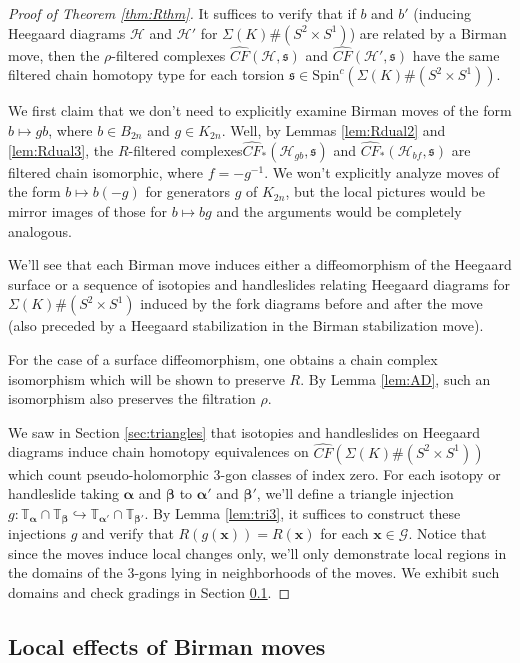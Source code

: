 \documentclass[11pt]{article}
\theoremstyle{plain} \newtheorem{thm}{Theorem}[subsection]
\theoremstyle{plain} \newtheorem{cor}[thm]{Corollary}
\theoremstyle{plain} \newtheorem{prop}[thm]{Proposition}
\theoremstyle{plain} \newtheorem{conj}[thm]{Conjecture}
\theoremstyle{plain} \newtheorem{lem}[thm]{Lemma}
\theoremstyle{definition} \newtheorem{df}[thm]{Definition}
\theoremstyle{remark} \newtheorem{rmk}[thm]{Remark}
\theoremstyle{remark} \newtheorem{obs}[thm]{Observation}
\newcommand{\B}[1]{B_{#1} }
\newcommand{\K}[1]{K_{#1} }
\newcommand{\DBCs}[1]{\Sigma(#1)\#(S^{2}\times S^{1})}
\newcommand{\G}{\mathcal{G}}
\newcommand{\h}{\mathcal{H}}
\newcommand{\Scx}[1]{\text{Spin}^{c}(\DBCs{#1})}
\newcommand{\ba}{\boldsymbol{\alpha}}
\newcommand{\bb}{\boldsymbol{\beta}}
\newcommand{\bx}{\mathbf{x}}
\newcommand{\tor}[1]{\mathbb{T}_{#1}}
\begin{document}
\begin{proof}[Proof of Theorem \ref{thm:Rthm}]
It suffices to verify that if $b$ and $b'$ (inducing Heegaard diagrams $\h$ and $\h'$ for $\DBCs{K}$) are related by a Birman move, then the $\rho$-filtered complexes $\widehat{CF}(\h, \mathfrak{s})$ and $\widehat{CF}(\h', \mathfrak{s})$ have the same filtered chain homotopy type for each torsion $\mathfrak{s} \in \Scx{K}$.

We first claim that we don't need to explicitly examine Birman moves of the form $b \mapsto gb$, where $b \in \B{2n}$ and $g \in \K{2n}$.  Well, by Lemmas \ref{lem:Rdual2} and \ref{lem:Rdual3}, the $R$-filtered complexes$\widehat{CF}_{*}(\h_{gb}, \mathfrak{s})$ and $\widehat{CF}_{*}(\h_{bf}, \mathfrak{s})$ are filtered chain isomorphic, where $f = -g^{-1}$.  We won't explicitly analyze moves of the form $b \mapsto b(-g)$ for generators $g$ of $\K{2n}$, but the local pictures would be mirror images of those for $b \mapsto bg$ and the arguments would be completely analogous.

We'll see that each Birman move induces either a diffeomorphism of the Heegaard surface or a sequence of isotopies and handleslides relating Heegaard diagrams for $\DBCs{K}$ induced by the fork diagrams before and after the move (also preceded by a Heegaard stabilization in the Birman stabilization move).

For the case of a surface diffeomorphism, one obtains a chain complex isomorphism which will be shown to  preserve $R$.  By Lemma \ref{lem:AD}, such an isomorphism also preserves the filtration $\rho$.

We saw in Section \ref{sec:triangles} that isotopies and handleslides on Heegaard diagrams induce chain homotopy equivalences on $\widehat{CF}(\DBCs{K})$ which count pseudo-holomorphic 3-gon classes of index zero.  For each isotopy or handleslide taking $\ba$ and $\bb$ to $\ba'$ and $\bb'$, we'll define a triangle injection $g:\tor{\ba} \cap \tor{\bb} \hookrightarrow \tor{\ba'} \cap \tor{\bb'}$.  By Lemma \ref{lem:tri3},  it suffices to construct these injections $g$ and verify that $R(g(\bx)) = R(\bx)$ for each $\bx \in \G$.  Notice that since the moves induce local changes only, we'll only demonstrate local regions in the domains of the 3-gons lying in neighborhoods of the moves.  We exhibit such domains and check gradings in Section \ref{sec:moves}.
\end{proof}
\subsection{Local effects of Birman moves}\label{sec:moves}
\end{document}

